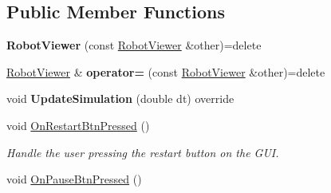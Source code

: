 \subsection*{Public Member Functions}
\begin{DoxyCompactItemize}
\item 
{\bfseries Robot\+Viewer} (const \hyperlink{classRobotViewer}{Robot\+Viewer} \&other)=delete\hypertarget{classRobotViewer_a722235e9d5cc60161e15dd189bf79566}{}\label{classRobotViewer_a722235e9d5cc60161e15dd189bf79566}

\item 
\hyperlink{classRobotViewer}{Robot\+Viewer} \& {\bfseries operator=} (const \hyperlink{classRobotViewer}{Robot\+Viewer} \&other)=delete\hypertarget{classRobotViewer_a4e7109141d452ea091e776d0069e03fb}{}\label{classRobotViewer_a4e7109141d452ea091e776d0069e03fb}

\item 
void {\bfseries Update\+Simulation} (double dt) override\hypertarget{classRobotViewer_a05c15913e55cd6925a089ce7c1fa5a55}{}\label{classRobotViewer_a05c15913e55cd6925a089ce7c1fa5a55}

\item 
void \hyperlink{classRobotViewer_a53b22985d65f9d2feb02deef32346030}{On\+Restart\+Btn\+Pressed} ()\hypertarget{classRobotViewer_a53b22985d65f9d2feb02deef32346030}{}\label{classRobotViewer_a53b22985d65f9d2feb02deef32346030}

\begin{DoxyCompactList}\small\item\em Handle the user pressing the restart button on the G\+UI. \end{DoxyCompactList}\item 
void \hyperlink{classRobotViewer_ac1797fc2a436b9e176baf526ca9e9936}{On\+Pause\+Btn\+Pressed} ()\hypertarget{classRobotViewer_ac1797fc2a436b9e176baf526ca9e9936}{}\label{classRobotViewer_ac1797fc2a436b9e176baf526ca9e9936}


\end{DoxyCompactItemize}
